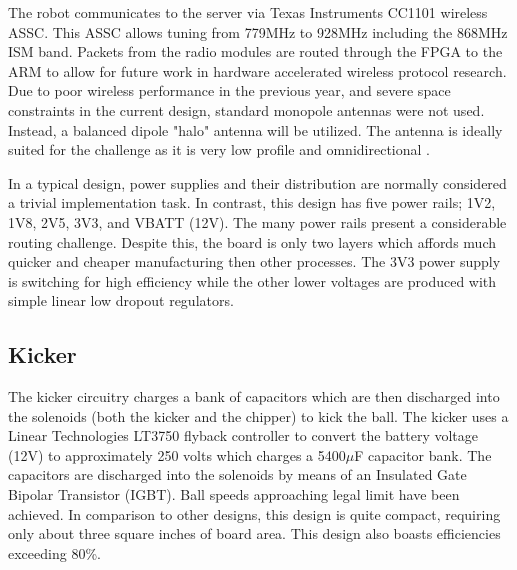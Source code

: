 The robot communicates to the server via Texas Instruments CC1101 wireless ASSC. This ASSC allows tuning from 779MHz to 928MHz including the 868MHz ISM band. Packets from the radio modules are routed through the FPGA to the ARM to allow for future work in hardware accelerated wireless protocol research. Due to poor wireless performance in the previous year, and severe space constraints in the current design, standard monopole antennas were not used. Instead, a balanced dipole "halo" antenna will be utilized. The antenna is ideally suited for the challenge as it is very low profile and omnidirectional \cite{harrisonjr1961fda}.

In a typical design, power supplies and their distribution are normally considered a trivial implementation task. In contrast, this design has five power rails; 1V2, 1V8, 2V5, 3V3, and VBATT (12V). The many power rails present a considerable routing challenge. Despite this, the board is only two layers which affords much quicker and cheaper manufacturing then other processes. The 3V3 power supply is switching for high efficiency while the other lower voltages are produced with simple linear low dropout regulators.

\subsection{Kicker}
The kicker circuitry charges a bank of capacitors which are then discharged into the solenoids (both the kicker and the chipper) to kick the ball. The kicker uses a Linear Technologies LT3750 flyback controller to convert the battery voltage (12V) to approximately 250 volts which charges a 5400$\mu$F capacitor bank. The capacitors are discharged into the solenoids by means of an Insulated Gate Bipolar Transistor (IGBT). Ball speeds approaching legal limit have been achieved. In comparison to other designs, this design is quite compact, requiring only about three square inches of board area. This design also boasts efficiencies exceeding 80\%. 
